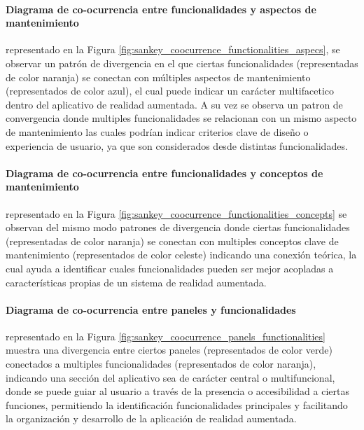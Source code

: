             \paragraph{Diagrama de co-ocurrencia entre funcionalidades y aspectos de mantenimiento} representado en la Figura \ref{fig:sankey_coocurrence_functionalities_aspecs}, se  observar un patrón de divergencia en el que ciertas funcionalidades (representadas de color naranja) se conectan con múltiples aspectos de mantenimiento (representados de color azul), el cual puede indicar un carácter multifacetico dentro del aplicativo de realidad aumentada. A su vez se observa un patron de convergencia donde multiples funcionalidades se relacionan con un mismo aspecto de mantenimiento las cuales podrían indicar criterios clave de diseño o experiencia de usuario, ya que son considerados desde distintas funcionalidades.
            
            

            \paragraph{Diagrama de co-ocurrencia entre funcionalidades y conceptos de mantenimiento} representado en la Figura \ref{fig:sankey_coocurrence_functionalities_concepts} se observan del mismo modo patrones de divergencia donde ciertas funcionalidades (representadas de color naranja) se conectan con multiples conceptos clave de mantenimiento (representados de color celeste) indicando una conexión teórica, la cual ayuda a identificar cuales funcionalidades pueden ser mejor acopladas a características propias de un sistema de realidad aumentada.

            

            \paragraph{Diagrama de co-ocurrencia entre paneles y funcionalidades} representado en la Figura \ref{fig:sankey_coocurrence_panels_functionalities} muestra una divergencia entre ciertos paneles (representados de color verde) conectados a multiples funcionalidades (representados de color naranja), indicando una sección del aplicativo sea de carácter central o multifuncional, donde se puede guiar al usuario a través de la presencia o accesibilidad a ciertas funciones, permitiendo la identificación funcionalidades principales y facilitando la organización y desarrollo de la aplicación de realidad aumentada. 

            